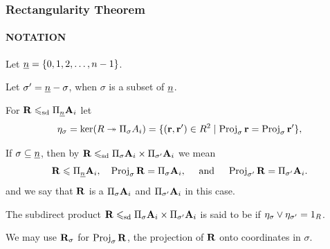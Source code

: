 \documentclass[xcolor=dvipsnames,9pt,hide notes,mathserif]{beamer}
\begin{document}
\begin{frame} \frametitle{Rectangularity Theorem}
  \framesubtitle{NOTATION}

  Let $\underline{n} =\{0, 1, 2, \dots, n-1\}$.

  \bigskip

  Let $\sigma' = \underline{n} -\sigma$, when $\sigma$ is a subset of $\underline{n}$.

  \bigskip

  For $\mathbf{R} \leqslant_{\mathrm{sd}} \Pi_{\underline{n}}\mathbf{A}_i$ %
  let
  \[
  \eta_\sigma = \ker(R \twoheadrightarrow \Pi_\sigma A_i) = \{(\mathbf{r}, \mathbf{r}') \in R^2 \mid
  \operatorname{Proj}_\sigma \mathbf{r} = \operatorname{Proj}_\sigma \mathbf{r}' \},
  \]


  If $\sigma\subseteq \underline{n}$, then by
  $\mathbf{R} \leqslant_{\mathrm{sd}} \Pi_\sigma \mathbf{A}_i \times \Pi_{\sigma'}\mathbf{A}_i$ we 
  mean
  \[
  \mathbf{R}\leqslant \Pi_{\underline{n}} \mathbf{A}_i, \quad 
\operatorname{Proj}_\sigma\mathbf{R} = \Pi_\sigma \mathbf{A}_i, \quad \text{ and }\quad
\operatorname{Proj}_{\sigma'}\mathbf{R} = \Pi_{\sigma'} \mathbf{A}_i.
\]
  and we say that $\mathbf{R}$ is a  
  $\Pi_\sigma \mathbf{A}_i$ and $\Pi_{\sigma'}\mathbf{A}_i$ in this case.

  \bigskip 

  The subdirect product $\mathbf{R} \leqslant_{\mathrm{sd}} \Pi_\sigma \mathbf{A}_i \times
  \Pi_{\sigma'}\mathbf{A}_i$ 
  is said to be  if $\eta_\sigma \vee \eta_{\sigma'} = 1_R$.

  \bigskip

  We may use $\mathbf{R}_\sigma$ for $\operatorname{Proj}_\sigma\mathbf{R}$, the projection 
  of $\mathbf{R}$ onto coordinates in $\sigma$.

  
\end{frame}
\end{document}
